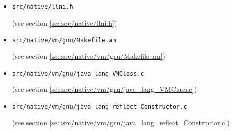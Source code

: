 \documentclass[a4paper, 10pt, titlepage]{scrartcl} %
\begin{document}
\begin{itemize}
 \item \begin{scriptsize}\verb|src|\hspace{0.0pt}\verb|/|\hspace{0.0pt}\verb|native|\hspace{0.0pt}\verb|/|\hspace{0.0pt}\verb|llni|\hspace{0.0pt}\verb|.|\hspace{0.0pt}\verb|h|\end{scriptsize} (see section \ref{sec:src/native/llni.h})
 \item \begin{scriptsize}\verb|src|\hspace{0.0pt}\verb|/|\hspace{0.0pt}\verb|native|\hspace{0.0pt}\verb|/|\hspace{0.0pt}\verb|vm|\hspace{0.0pt}\verb|/|\hspace{0.0pt}\verb|gnu|\hspace{0.0pt}\verb|/|\hspace{0.0pt}\verb|Makefile|\hspace{0.0pt}\verb|.|\hspace{0.0pt}\verb|am|\end{scriptsize} (see section \ref{sec:src/native/vm/gnu/Makefile.am})
 \item \begin{scriptsize}\verb|src|\hspace{0.0pt}\verb|/|\hspace{0.0pt}\verb|native|\hspace{0.0pt}\verb|/|\hspace{0.0pt}\verb|vm|\hspace{0.0pt}\verb|/|\hspace{0.0pt}\verb|gnu|\hspace{0.0pt}\verb|/|\hspace{0.0pt}\verb|java_lang_VMClass|\hspace{0.0pt}\verb|.|\hspace{0.0pt}\verb|c|\end{scriptsize} (see section \ref{sec:src/native/vm/gnu/java_lang_VMClass.c})
 \item \begin{scriptsize}\verb|src|\hspace{0.0pt}\verb|/|\hspace{0.0pt}\verb|native|\hspace{0.0pt}\verb|/|\hspace{0.0pt}\verb|vm|\hspace{0.0pt}\verb|/|\hspace{0.0pt}\verb|gnu|\hspace{0.0pt}\verb|/|\hspace{0.0pt}\verb|java_lang_reflect_Constructor|\hspace{0.0pt}\verb|.|\hspace{0.0pt}\verb|c|\end{scriptsize} (see section \ref{sec:src/native/vm/gnu/java_lang_reflect_Constructor.c})

\end{itemize}
\end{document}
